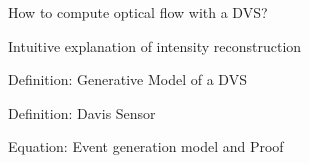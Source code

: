 \documentclass[10pt,a4paper]{scrartcl}
\begin{document}
\begin{multicols*}{2}
\begin{QandA}
{How to compute optical flow with a DVS?}
\item
\end{QandA}

\begin{QandA}
{Intuitive explanation of intensity reconstruction}
\item
\end{QandA}

\begin{QandA}
{Definition: Generative Model of a DVS}
\item
\end{QandA}

\begin{QandA}
{Definition: Davis Sensor}
\item
\end{QandA}

\begin{QandA}
{Equation: Event generation model and Proof}
\item
\end{QandA}

\end{multicols*}
\end{document}
